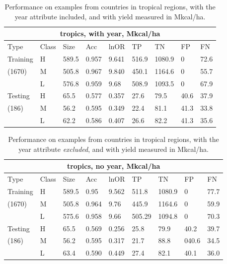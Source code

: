 \documentclass[11pt]{article}
\begin{document}
\begin{table}[h!]
\centering
\begin{tabular}{lllllllll}
\toprule
\multicolumn{9}{c}{\textbf{tropics, with year, Mkcal/ha}} \\
\midrule
Type & Class & Size & Acc & lnOR & TP & TN & FP & FN \\
\midrule
Training & H & 589.5 & 0.957 & 9.641 & 516.9 & 1080.9 & 0 & 72.6  \\
(1670) & M & 505.8 & 0.967 & 9.840 & 450.1 & 1164.6 & 0 & 55.7  \\
& L & 576.8 & 0.959 & 9.68 & 508.9 & 1093.5 & 0 & 67.9  \\
Testing & H & 65.5 & 0.577 & 0.357 & 27.6 & 79.5 & 40.6 & 37.9  \\
(186) & M & 56.2 & 0.595 & 0.349 & 22.4 & 81.1 & 41.3 & 33.8  \\
& L & 62.2 & 0.586 & 0.407 & 26.6 & 82.2 & 41.3 & 35.6  \\
\bottomrule
\end{tabular}
\caption{Performance on examples from countries in tropical regions, with the year attribute included, and with yield measured in Mkcal/ha.}
\label{k.wy.trop_results}
\end{table}

\begin{table}[h!]
\centering
\begin{tabular}{lllllllll}
\toprule
\multicolumn{9}{c}{\textbf{tropics, no year, Mkcal/ha}} \\
\midrule
Type & Class & Size & Acc & lnOR & TP & TN & FP & FN \\
\midrule
Training & H & 589.5 & 0.95 & 9.562 & 511.8 & 1080.9 & 0 & 77.7  \\
(1670) & M & 505.8 & 0.964 & 9.76 & 445.9 & 1164.6 & 0 & 59.9  \\
& L & 575.6 & 0.958 & 9.66 & 505.29 & 1094.8 & 0 & 70.3  \\
Testing & H & 65.5 & 0.569 & 0.256 & 25.8 & 79.9 & 40.2 & 39.7  \\
(186) & M & 56.2 & 0.595 & 0.317 & 21.7 & 88.8 & 040.6 & 34.5  \\
& L & 63.4 & 0.590 & 0.449 & 27.4 & 82.1 & 40.1 & 36.0  \\
\bottomrule
\end{tabular}
\caption{Performance on examples from countries in tropical regions, with the year attribute \emph{excluded}, and with yield measured in Mkcal/ha.}
\label{k.ny.trop_results}
\end{table}
\end{document}
